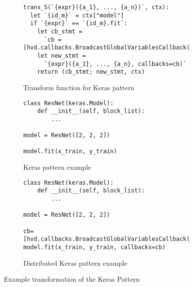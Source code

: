 \begin{figure}[ht!]\centering

\begin{subfigure}{1\textwidth}
\begin{lstlisting}[style=mpython]
trans_S(`{expr}({a_1}, ..., {a_n})`, ctx):
  let `{id_m}` = ctx["model"]
  if `{expr}` == `{id_m}.fit`:
    let cb_stmt = 
      `cb = [hvd.callbacks.BroadcastGlobalVariablesCallback(root_rank=0)]`
    let new_stmt =
      `{expr}({a_1}, ..., {a_n}, callbacks=cb)`	
    return (cb_stmt; new_stmt, ctx) 
\end{lstlisting}
\caption{Transform function for Keras pattern}
\label{fig:trans:keras:fn}
\end{subfigure}

  \begin{subfigure}[t]{1\textwidth}
  \begin{lstlisting}[style=mpython]
class ResNet(keras.Model):
    def __init__(self, block_list):
        ...

model = ResNet([2, 2, 2])

model.fit(x_train, y_train)\end{lstlisting}
  \caption{Keras pattern example}
    \label{fig:trans:keras:a}
  \end{subfigure}
  \hspace{3mm}
  \begin{subfigure}[t]{1\textwidth}
  \begin{lstlisting}[style=mpython]
class ResNet(keras.Model):
    def __init__(self, block_list):
        ...

model = ResNet([2, 2, 2])

cb=[hvd.callbacks.BroadcastGlobalVariablesCallback(0)]
model.fit(x_train, y_train, callbacks=cb)
\end{lstlisting}
    \caption{Distributed Keras pattern example}
    \label{fig:trans:keras:b}
  \end{subfigure}
  \caption{Example transformation of the Keras Pattern}
  \label{fig:trans:keras}
\end{figure}


